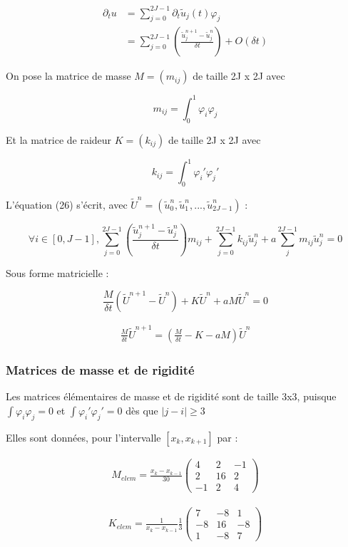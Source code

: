 \documentclass[french]{article}
\begin{document}
\begin{align}
\partial_{t}u &= \sum_{j=0}^{2J-1}\partial_{t}\tilde{u}_{j}(t)\varphi_{j} \\
&= \sum_{j=0}^{2J-1}\left( \frac{\tilde{u}_{j}^{n+1}-\tilde{u}_{j}^{n}}{\delta t}\right)
+O(\delta t)
\end{align}

On pose la matrice de masse $ M = (m_{ij}) $ de taille 2J x 2J avec

\[
m_{ij}=\int_{0}^{1}\varphi_{i}\varphi_{j} 
\]

Et la matrice de raideur $ K = (k_{ij}) $ de taille 2J x 2J avec

\[
k_{ij}=\int_{0}^{1}\varphi_{i}'\varphi_{j}' 
\]

L'équation (26) s'écrit, avec $ \tilde{U}^{n}=(\tilde{u}_{0}^{n}, \tilde{u}_{1}^{n}, ..., \tilde{u}_{2J-1}^{n}) $ :

\[
\forall i \in [0,J-1], 
\sum_{j=0}^{2J-1}\left( \frac{\tilde{u}_{j}^{n+1}-\tilde{u}_{j}^{n}}{\delta t}\right)m_{ij}+
\sum_{j=0}^{2J-1}k_{ij}\tilde{u}_{j}^{n}+
a\sum_{j}^{2J-1}m_{ij}\tilde{u}^{n}_{j}=0
\]

Sous forme matricielle :

\[
\frac{M}{\delta t}(\tilde{U}^{n+1}-\tilde{U}^{n})+K\tilde{U}^{n}+aM\tilde{U}^{n}=0
\]

\begin{align}
\frac{M}{\delta t}\tilde{U}^{n+1}=
\left(
\frac{M}{\delta t}-K-aM
\right)\tilde{U}^{n}
\end{align}

\subsubsection{Matrices de masse et de rigidité}

Les matrices élémentaires de masse et de rigidité sont de taille 3x3, puisque $ \int \varphi_{i}\varphi_{j} = 0 $ et $ \int \varphi_{i}'\varphi_{j}' = 0 $ dès que $ |j-i| \geq 3 $

Elles sont données, pour l'intervalle $ [x_{k},x_{k+1}] $ par :

\begin{align}
M_{elem}= \frac{x_{k}-x_{k-1}}{30}
\left(
\begin{matrix}
4 & 2 & -1 \\
2 & 16 & 2 \\
-1 & 2 & 4
\end{matrix}
\right)
\end{align}

\begin{align}
K_{elem}= \frac{1}{x_{k}-x_{k-1}}\frac{1}{3}
\left(
\begin{matrix}
7 & -8 & 1 \\
-8 & 16 & -8 \\
1 & -8 & 7
\end{matrix}
\right)
\end{align}
\end{document}
